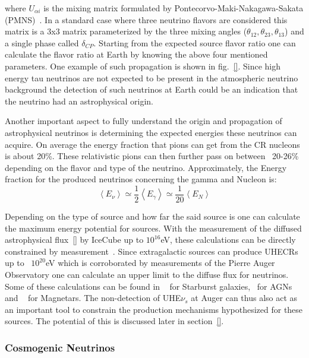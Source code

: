 where $U_{\alpha i}$ is the mixing matrix formulated by Pontecorvo-Maki-Nakagawa-Sakata (PMNS)~\cite{}. In a standard case where three neutrino flavors are considered this matrix is a 3x3 matrix parameterized by the three mixing angles ($\theta_{12},\theta_{23},\theta_{13}$) and a single phase called $\delta_{CP}$. Starting from the expected source flavor ratio one can calculate the flavor ratio at Earth by knowing the above four mentioned parameters. One example of such propagation is shown in fig.~\ref{}. Since high energy tau neutrinos are not expected to be present in the atmospheric neutrino background the detection of such neutrinos at Earth could be an indication that the neutrino had an astrophysical origin. 

Another important aspect to fully understand the origin and propagation of astrophysical neutrinos is determining the expected energies these neutrinos can acquire. On average the energy fraction that pions can get from the CR nucleons is about 20\%. These relativistic pions can then further pass on between ~20-26\% depending on the flavor and type of the neutrino. Approximately, the Energy fraction for the produced neutrinos concerning the gamma and Nucleon is:
\begin{equation}
  \left\langle E_{\nu} \right\rangle  \simeq  \frac{1}{2}\left\langle E_{\gamma} \right\rangle \simeq  \frac{1}{20}\left\langle E_{N} \right\rangle
  \end{equation}

Depending on the type of source and how far the said source is one can calculate the maximum energy potential for sources. With the measurement of the diffused astrophysical flux~\ref{} by IceCube up to $10^{16}$eV, these calculations can be directly constrained by measurement~\cite{}. Since extragalactic sources can produce UHECRs up to ~$10^{20}$eV which is corroborated by measurements of the Pierre Auger Observatory one can calculate an upper limit to the diffuse flux for neutrinos. Some of these calculations can be found in ~\cite{} for Starburst galaxies, ~\cite{}for AGNs and ~\cite{} for Magnetars. The non-detection of UHE$\nu_s$ at Auger can thus also act as an important tool to constrain the production mechanisms hypothesized for these sources. The potential of this is discussed later in section~\ref{}.   

\subsubsection*{Cosmogenic Neutrinos}
\label{subsubsec:CosmoNu}

